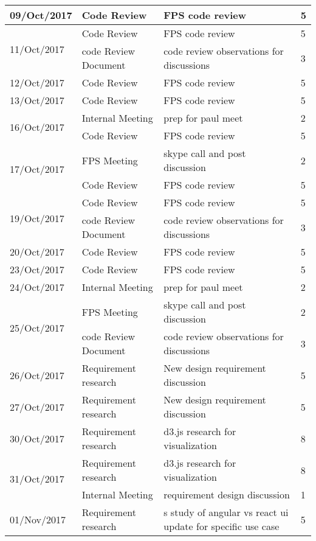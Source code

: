 \documentclass[]{invoice-style}
\begin{document}
\begin{minipage}[][][c]{\textwidth}
\begin {tabular}{  m{2cm} | m{4.5cm} | m{5cm} | m{3cm}  }
\hline
\multirow{1}{*}{09/Oct/2017}&Code Review & FPS code review&5\\
\hline\multirow{2}{*}{11/Oct/2017}&Code Review & FPS code review&5\\
&code Review Document&code review observations for discussions&3\\
\hline\multirow{1}{*}{12/Oct/2017}&Code Review & FPS code review&5\\
\hline\multirow{1}{*}{13/Oct/2017}&Code Review & FPS code review&5\\
\hline\multirow{2}{*}{16/Oct/2017}&Internal Meeting & prep for paul meet &2\\
&Code Review & FPS code review&5\\
\hline\multirow{2}{*}{17/Oct/2017}&FPS Meeting & skype call and post discussion &2\\
&Code Review & FPS code review&5\\
\hline\multirow{2}{*}{19/Oct/2017}&Code Review & FPS code review&5\\
&code Review Document&code review observations for discussions&3\\
\hline\multirow{1}{*}{20/Oct/2017}&Code Review & FPS code review&5\\
\hline\multirow{1}{*}{23/Oct/2017}&Code Review & FPS code review&5\\
\hline\multirow{1}{*}{24/Oct/2017}&Internal Meeting & prep for paul meet &2\\
\hline\multirow{2}{*}{25/Oct/2017}&FPS Meeting & skype call and post discussion &2\\
&code Review Document&code review observations for discussions&3\\
\hline\multirow{1}{*}{26/Oct/2017}&Requirement research & New design requirement discussion&5\\
\hline\multirow{1}{*}{27/Oct/2017}&Requirement research & New design requirement discussion&5\\
\hline\multirow{1}{*}{30/Oct/2017}&Requirement research & d3.js research for visualization&8\\
\hline\multirow{2}{*}{31/Oct/2017}&Requirement research & d3.js research for visualization&8\\
&Internal Meeting &requirement design discussion &1\\
\hline\multirow{1}{*}{01/Nov/2017}&Requirement research & s study of angular vs react ui update for specific use case&5\\
\end{tabular}
	\end{minipage}
\end{document}
